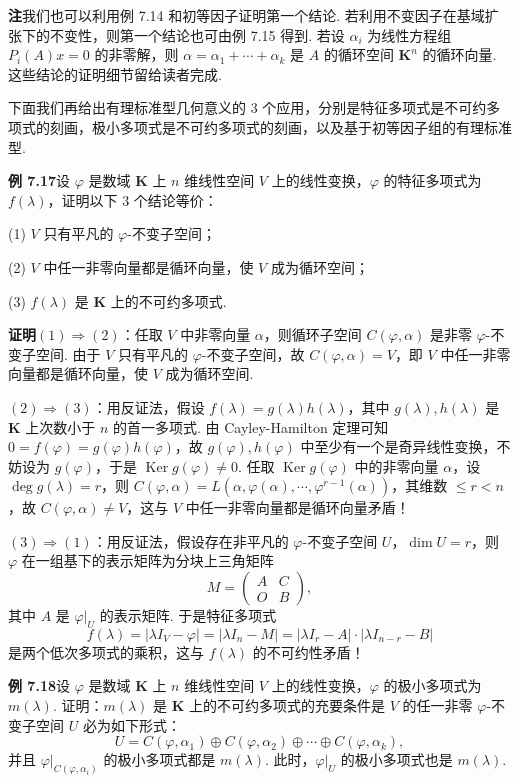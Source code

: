 \documentclass[UTF8, 12pt, fontset=fandol, oneside]{ctexart}
\begin{document}
\noindent\textbf{注}\quad 我们也可以利用例 7.14 和初等因子证明第一个结论. 若利用不变因子在基域扩张下的不变性，则第一个结论也可由例 7.15 得到. 若设 $\alpha_i$ 为线性方程组 $P_i(A)x=0$ 的非零解，则 $\alpha=\alpha_1+\cdots+\alpha_k$ 是 $A$ 的循环空间 $\mathbf{K}^n$ 的循环向量. 这些结论的证明细节留给读者完成.

下面我们再给出有理标准型几何意义的 3 个应用，分别是特征多项式是不可约多项式的刻画，极小多项式是不可约多项式的刻画，以及基于初等因子组的有理标准型.

\noindent\textbf{例 7.17}\quad 设 $\varphi$ 是数域 $\mathbf{K}$ 上 $n$ 维线性空间 $V$ 上的线性变换，$\varphi$ 的特征多项式为 $f(\lambda)$，证明以下 3 个结论等价：

(1) $V$ 只有平凡的 $\varphi$-不变子空间；

(2) $V$ 中任一非零向量都是循环向量，使 $V$ 成为循环空间；

(3) $f(\lambda)$ 是 $\mathbf{K}$ 上的不可约多项式.

\noindent\textbf{证明}\quad $(1)\Rightarrow(2)$：任取 $V$ 中非零向量 $\alpha$，则循环子空间 $C(\varphi,\alpha)$ 是非零 $\varphi$-不变子空间. 由于 $V$ 只有平凡的 $\varphi$-不变子空间，故 $C(\varphi,\alpha)=V$，即 $V$ 中任一非零向量都是循环向量，使 $V$ 成为循环空间.

$(2)\Rightarrow(3)$：用反证法，假设 $f(\lambda)=g(\lambda)h(\lambda)$，其中 $g(\lambda),h(\lambda)$ 是 $\mathbf{K}$ 上次数小于 $n$ 的首一多项式. 由 Cayley-Hamilton 定理可知 $0=f(\varphi)=g(\varphi)h(\varphi)$，故 $g(\varphi),h(\varphi)$ 中至少有一个是奇异线性变换，不妨设为 $g(\varphi)$，于是 $\operatorname{Ker}g(\varphi)\ne 0$. 任取 $\operatorname{Ker}g(\varphi)$ 中的非零向量 $\alpha$，设 $\deg g(\lambda)=r$，则 $C(\varphi,\alpha)=L(\alpha,\varphi(\alpha),\cdots,\varphi^{r-1}(\alpha))$，其维数 $\le r<n$，故 $C(\varphi,\alpha)\ne V$，这与 $V$ 中任一非零向量都是循环向量矛盾！

$(3)\Rightarrow(1)$：用反证法，假设存在非平凡的 $\varphi$-不变子空间 $U$，$\dim U=r$，则 $\varphi$ 在一组基下的表示矩阵为分块上三角矩阵
\[
M=\left(\begin{array}{cc}
A & C\\
O & B
\end{array}\right),
\]
其中 $A$ 是 $\varphi|_U$ 的表示矩阵. 于是特征多项式
\[
f(\lambda)=|\lambda I_V-\varphi|=|\lambda I_n-M|=|\lambda I_r-A|\cdot|\lambda I_{n-r}-B|
\]
是两个低次多项式的乘积，这与 $f(\lambda)$ 的不可约性矛盾！

\noindent\textbf{例 7.18}\quad 设 $\varphi$ 是数域 $\mathbf{K}$ 上 $n$ 维线性空间 $V$ 上的线性变换，$\varphi$ 的极小多项式为 $m(\lambda)$. 证明：$m(\lambda)$ 是 $\mathbf{K}$ 上的不可约多项式的充要条件是 $V$ 的任一非零 $\varphi$-不变子空间 $U$ 必为如下形式：
\[
U=C(\varphi,\alpha_1)\oplus C(\varphi,\alpha_2)\oplus\cdots\oplus C(\varphi,\alpha_k),
\]
并且 $\varphi|_{C(\varphi,\alpha_i)}$ 的极小多项式都是 $m(\lambda)$. 此时，$\varphi|_U$ 的极小多项式也是 $m(\lambda)$.
\end{document}
